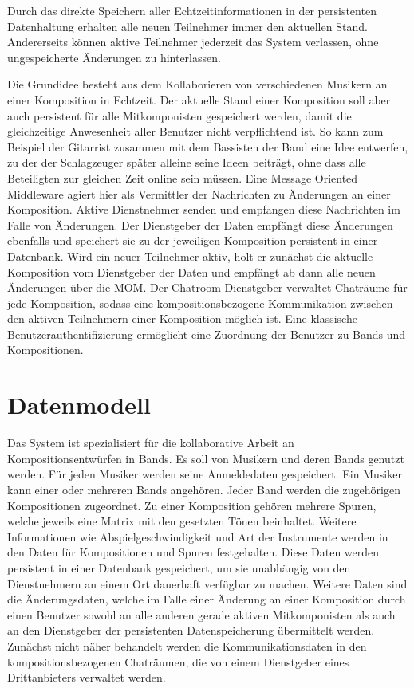 \documentclass[12pt]{scrartcl}
\begin{document}
Durch das direkte Speichern aller Echtzeitinformationen in der persistenten Datenhaltung erhalten alle neuen Teilnehmer immer den aktuellen Stand. Andererseits können aktive Teilnehmer jederzeit das System verlassen, ohne ungespeicherte Änderungen zu hinterlassen.


Die Grundidee besteht aus dem Kollaborieren von verschiedenen Musikern an einer Komposition in Echtzeit. Der aktuelle Stand einer Komposition soll aber auch persistent für alle Mitkomponisten gespeichert werden, damit die gleichzeitige Anwesenheit aller Benutzer nicht verpflichtend ist. So kann zum Beispiel der Gitarrist zusammen mit dem Bassisten der Band eine Idee entwerfen, zu der der Schlagzeuger später alleine seine Ideen beiträgt, ohne dass alle Beteiligten zur gleichen Zeit online sein müssen.
Eine Message Oriented Middleware agiert hier als Vermittler der Nachrichten zu Änderungen an einer Komposition. Aktive Dienstnehmer senden und empfangen diese Nachrichten im Falle von Änderungen. Der Dienstgeber der Daten empfängt diese Änderungen ebenfalls und speichert sie zu der jeweiligen Komposition persistent in einer Datenbank. Wird ein neuer Teilnehmer aktiv, holt er zunächst die aktuelle Komposition vom Dienstgeber der Daten und empfängt ab dann alle neuen Änderungen über die MOM.
Der Chatroom Dienstgeber verwaltet Chaträume für jede Komposition, sodass eine kompositionsbezogene Kommunikation zwischen den aktiven Teilnehmern einer Komposition möglich ist.
Eine klassische Benutzerauthentifizierung ermöglicht eine Zuordnung der Benutzer zu Bands und Kompositionen.


\section{Datenmodell}




Das System ist spezialisiert für die kollaborative Arbeit an Kompositionsentwürfen in Bands. Es soll von Musikern und deren Bands genutzt werden. Für jeden Musiker werden seine Anmeldedaten gespeichert. Ein Musiker kann einer oder mehreren Bands angehören. Jeder Band werden die zugehörigen Kompositionen zugeordnet. Zu einer Komposition gehören mehrere Spuren, welche jeweils eine Matrix mit den gesetzten Tönen beinhaltet. Weitere Informationen wie Abspielgeschwindigkeit und Art der Instrumente werden in den Daten für Kompositionen und Spuren festgehalten. Diese Daten werden persistent in einer Datenbank gespeichert, um sie unabhängig von den Dienstnehmern an einem Ort dauerhaft verfügbar zu machen.
Weitere Daten sind die Änderungsdaten, welche im Falle einer Änderung an einer Komposition durch einen Benutzer sowohl an alle anderen gerade aktiven Mitkomponisten als auch an den Dienstgeber der persistenten Datenspeicherung übermittelt werden.
Zunächst nicht näher behandelt werden die Kommunikationsdaten in den kompositionsbezogenen Chaträumen, die von einem Dienstgeber eines Drittanbieters verwaltet werden.
\end{document}
